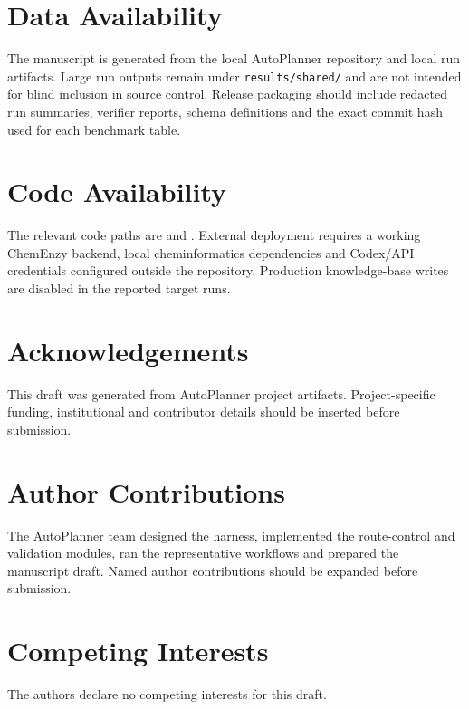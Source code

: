 \documentclass[11pt]{article}
\begin{document}
\section*{Data Availability}

The manuscript is generated from the local AutoPlanner repository and local run artifacts. Large run outputs remain under \texttt{results/shared/} and are not intended for blind inclusion in source control. Release packaging should include redacted run summaries, verifier reports, schema definitions and the exact commit hash used for each benchmark table.

\section*{Code Availability}

The relevant code paths are  and . External deployment requires a working ChemEnzy backend, local cheminformatics dependencies and Codex/API credentials configured outside the repository. Production knowledge-base writes are disabled in the reported target runs.

\section*{Acknowledgements}

This draft was generated from AutoPlanner project artifacts. Project-specific funding, institutional and contributor details should be inserted before submission.

\section*{Author Contributions}

The AutoPlanner team designed the harness, implemented the route-control and validation modules, ran the representative workflows and prepared the manuscript draft. Named author contributions should be expanded before submission.

\section*{Competing Interests}

The authors declare no competing interests for this draft.



\end{document}
